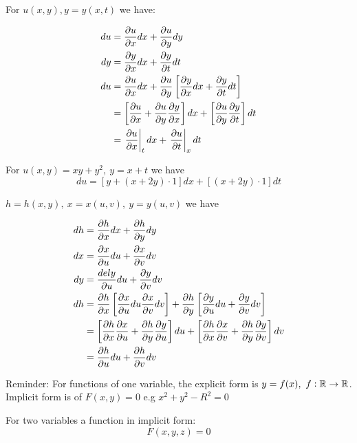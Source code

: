 \documentclass[10pt]{scrartcl}
\begin{document}
For $u(x,y), y = y(x,t)$ we have:

\[
\begin{aligned}
  du &= \frac{\partial u}{\partial x}dx + \frac{\partial u}{\partial y}dy\\
  dy &= \frac{\partial y}{\partial x}dx + \frac{\partial y}{\partial t}dt\\
  du &= \frac{\partial u}{\partial x}dx + \frac{\partial u}{\partial y}\left[\frac{\partial y}{\partial x}dx + \frac{\partial y}{\partial t}dt\right]\\
  &= \left[\frac{\partial u}{\partial x} + \frac{\partial u}{\partial y}\frac{\partial y}{\partial x}\right]dx + \left[\frac{\partial u}{\partial y}\frac{\partial y}{\partial t}\right]dt\\
  &= \left.\frac{\partial u}{\partial x}\right|_{t}dx + \left.\frac{\partial u}{\partial t}\right|_{x}dt
\end{aligned}
\]

\begin{example}
	For $u(x,y) = xy + y^2,~ y = x + t$ we have 
	\[du = [y + (x+2y)\cdot 1]dx + [(x+2y)\cdot 1]dt\]
\end{example}

$h = h(x,y),~ x = x(u,v),~y = y(u,v)$ we have 

\[
\begin{aligned}
  dh &= \frac{\partial h}{\partial x}dx + \frac{\partial h}{\partial y}dy\\
  dx &= \frac{\partial x}{\partial u}du + \frac{\partial x}{\partial v}dv\\
  dy &= \frac{del y}{\partial u}du + \frac{\partial y}{\partial v}dv\\
  dh &= \frac{\partial h}{\partial x}\left[\frac{\partial x}{\partial u}du \frac{\partial x}{\partial v}dv\right] + \frac{\partial h}{\partial y}\left[\frac{\partial y}{\partial u}du + \frac{\partial y}{\partial v}dv\right]\\
  &= \left[\frac{\partial h}{\partial x}\frac{\partial x}{\partial u} + \frac{\partial h}{\partial y}\frac{\partial y}{\partial u}\right]du + \left[\frac{\partial h}{\partial x}\frac{\partial x}{\partial v} + \frac{\partial h}{\partial y}\frac{\partial y}{\partial v}\right]dv\\
  &= \frac{\partial h}{\partial u}du + \frac{\partial h}{\partial v}dv
\end{aligned}
\]

Reminder: For functions of one variable, the explicit form is $y = f(x),~ f: \mathbb{R} \to \mathbb{R}$. Implicit form is of $F(x,y) = 0$ e.g $x^2 + y^2 -R^2 = 0$\\

\begin{definition}For two variables a function in implicit form: 
\[F(x,y,z) = 0\]
\end{definition}
\end{document}
